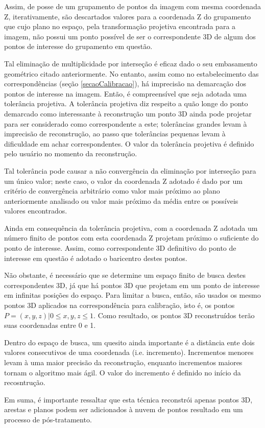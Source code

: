 	Assim, de posse de um grupamento de pontos da imagem com mesma coordenada Z, iterativamente, são descartados valores para a coordenada Z do grupamento que cujo plano no espaço, pela transformação projetiva encontrada para a imagem, não possui um ponto possível de ser o correspondente 3D de algum dos pontos de interesse do grupamento em questão.
	
	Tal eliminação de multiplicidade por interseção é eficaz dado o seu embasamento geométrico citado anteriormente. No entanto, assim como no estabelecimento das correspondências (seção \ref{secaoCalibracao}), há imprecisão na demarcação dos pontos de interesse na imagem. Então, é compreensível que seja adotada uma tolerância projetiva. A tolerância projetiva diz respeito a quão longe do ponto demarcado como interessante à reconstrução um ponto 3D ainda pode projetar para ser considerado como correspondente a este; tolerâncias grandes levam à imprecisão de reconstrução, ao passo que tolerâncias pequenas levam à dificuldade em achar correspondentes. O valor da tolerância projetiva é definido pelo usuário no momento da reconstrução. 
	
	Tal tolerância pode causar a não convergência da eliminação por interseção para um único valor; neste caso, o valor da coordenada Z adotado é dado por um critério de convergência arbitrário como valor mais próximo ao plano anteriormente analisado ou valor mais próximo da média entre os possíveis valores encontrados.
	
	Ainda em consequência da tolerância projetiva, com a coordenada Z adotada um número finito de pontos com esta coordenada Z projetam próximo o suficiente do ponto de interesse. Assim, como correspondente 3D definitivo do ponto de interesse em questão é adotado o baricentro destes pontos.
	
	Não obstante, é necessário que se determine um espaço finito de busca destes correspondentes 3D, já que há pontos 3D que projetam em um ponto de interesse em infinitas posições do espaço. Para limitar a busca, então, são usados os mesmo pontos 3D aplicados na correspondência para calibração, isto é, os pontos $P = {(x, y, z) | 0 \leq x, y, z \leq 1}$. Como resultado, os pontos 3D reconstruídos terão suas coordenadas entre 0 e 1.
	
	Dentro do espaço de busca, um quesito ainda importante é a distância ente dois valores consecutivos de uma coordenada (i.e. incremento). Incrementos menores levam à uma maior precisão da reconstrução, enquanto incrementos maiores tornam o algoritmo mais ágil. O valor do incremento é definido no início da recosntrução.
	
	Em suma, é importante ressaltar que esta técnica reconstrói apenas pontos 3D, arestas e planos podem ser adicionados à nuvem de pontos resultado em um processo de pós-tratamento.
	
	